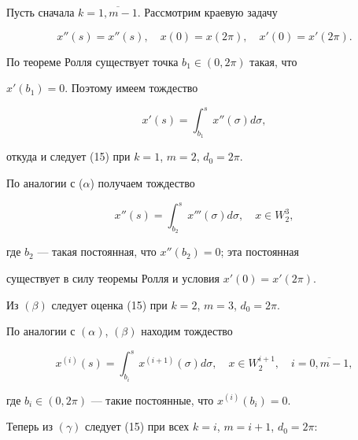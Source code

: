 Пусть сначала $k=\overline{1,m-1} $. Рассмотрим краевую задачу


$$


x''(s)=x''(s), \quad x(0)=x(2 \pi), \quad x'(0)=x'(2 \pi).


$$





По теореме Ролля существует точка $b_1 \in (0,2 \pi)$ такая, что


$x'(b_{1})=0$. Поэтому имеем тождество


\begin{equation}


x'(s)=\int _{b_1}^{s} x''( \sigma) d \sigma,


\tag{$\alpha$}


\end{equation}


откуда и следует (15) при $k=1$, $m=2$, $d_0=2 \pi$.





По аналогии с ($\alpha$) получаем тождество


\begin{equation}


x''(s)=\int_{b_2}^{s} x'''( \sigma) d \sigma,\quad x \in W_2^3,


\tag{$\beta$}


\end{equation}


где $b_2$ --- такая постоянная, что $x''(b_2)=0$; эта постоянная


существует в силу теоремы Ролля и условия $x'(0)=x'(2 \pi)$.


Из $(\beta)$ следует оценка (15) при $k=2$, $m=3$, $d_0=2 \pi$.





По аналогии с $(\alpha)$, $(\beta)$ находим тождество


\begin{equation}


x^{(i)}(s)=\int_{b_i}^s x^{(i+1)}( \sigma) d \sigma, \quad x \in W_2^{i+1},


\quad i={\overline{0,m-1}},


\tag{$\gamma$}


\end{equation}


где $b_i \in (0, 2 \pi)$ --- такие постоянные, что $x^{(i)}(b_i)=0$.


Теперь из $(\gamma)$ следует (15) при всех $k=i$, $m=i+1$, $d_0=2 \pi$:


